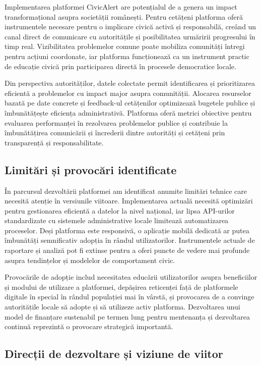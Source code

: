 \documentclass[12pt,a4paper]{report}
\begin{document}
Implementarea platformei CivicAlert are potențialul de a genera un impact transformațional asupra societății românești. Pentru cetățeni  platforma oferă instrumentele necesare pentru o implicare civică activă și responsabilă, creând un canal direct de comunicare cu autoritățile și posibilitatea urmăririi progresului în timp real. Vizibilitatea problemelor comune poate mobiliza comunități întregi pentru acțiuni coordonate, iar platforma funcționează ca un instrument practic de educație civică prin participarea directă în procesele democratice locale.

Din perspectiva autorităților, datele colectate permit identificarea și prioritizarea eficientă a problemelor cu impact major asupra comunității. Alocarea resurselor bazată pe date concrete și feedback-ul cetățenilor optimizează bugetele publice și îmbunătățește eficiența administrativă. Platforma oferă metrici obiective pentru evaluarea performanței în rezolvarea problemelor publice și contribuie la îmbunătățirea comunicării și încrederii dintre autorități și cetățeni prin transparență și responsabilitate.

\subsection{Limitări și provocări identificate}

În parcursul dezvoltării platformei am  identificat anumite limitări tehnice care necesită atenție în versiunile viitoare. Implementarea actuală necesită optimizări pentru gestionarea eficientă a datelor la nivel național, iar lipsa API-urilor standardizate cu sistemele administrative locale limitează automatizarea proceselor. Deși platforma este responsivă, o aplicație mobilă dedicată ar putea îmbunătăți semnificativ adopția în rândul utilizatorilor. Instrumentele actuale de raportare și analiză pot fi extinse pentru a oferi puncte de vedere  mai profunde asupra tendințelor și modelelor de comportament civic.

Provocările de adopție includ necesitatea educării utilizatorilor asupra beneficiilor și modului de utilizare a platformei, depășirea reticenței față de platformele digitale în special în rândul populației mai în vârstă, și provocarea de a convinge autoritățile locale să adopte și să utilizeze activ platforma. Dezvoltarea unui model de finanțare sustenabil pe termen lung pentru mentenanța și dezvoltarea continuă reprezintă o provocare strategică importantă.

\subsection{Direcții de dezvoltare și viziune de viitor}
\end{document}
